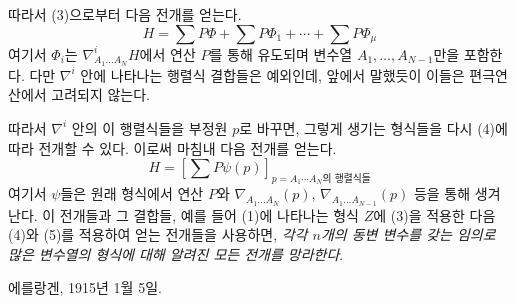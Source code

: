 따라서 (3)으로부터 다음 전개를 얻는다.
\begin{equation}
  H=\sum P\Phi+\sum P\Phi_1+\cdots+\sum P\Phi_\mu
\tag{4}
\end{equation}
여기서 $\Phi_i$는 $\nabla^i_{A_1\ldots A_N}H$에서 연산 $P$를 통해 유도되며 변수열 $A_1,\ldots,A_{N-1}$만을 포함한다. 다만 $\nabla^i$ 안에 나타나는 행렬식 결합들은 예외인데, 앞에서 말했듯이 이들은 편극연산에서 고려되지 않는다.

따라서 $\nabla^i$ 안의 이 행렬식들을 부정원 $p$로 바꾸면, 그렇게 생기는 형식들을 다시 (4)에 따라 전개할 수 있다. 이로써 마침내 다음 전개를 얻는다.
\begin{equation}
  H=\left[\sum P\psi(p)\right]_{p=\text{$A_1\cdots A_N$의 행렬식들}}
\tag{5}
\end{equation}
여기서 $\psi$들은 원래 형식에서 연산 $P$와 $\nabla_{A_1\ldots A_N}(p)$, $\nabla_{A_1\ldots A_{N-1}}(p)$ 등을 통해 생겨난다. 이 전개들과 그 결합들, 예를 들어 (1)에 나타나는 형식 $Z$에 (3)을 적용한 다음 (4)와 (5)를 적용하여 얻는 전개들을 사용하면, \emph{각각 $n$개의 동변 변수를 갖는 임의로 많은 변수열의 형식에 대해 알려진 모든 전개를 망라한다}.

에를랑겐, 1915년 1월 5일.



\clearpage
\setcounter{footnote}{0}
